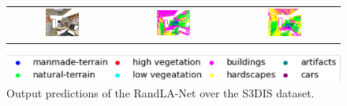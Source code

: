 \begin{figure}[h!]
\begin{tabular}{ccc}
            \includegraphics[width=0.33\textwidth, height=0.18\textheight]{images/seg_output/s3dis_DE/S3DIS_4_RGB.png} &
            \includegraphics[width=0.33\textwidth, height=0.18\textheight]{images/seg_output/s3dis_DE/S3DIS_4_Pred.png}&
            \includegraphics[width=0.33\textwidth, height=0.18\textheight]{images/seg_output/s3dis_DE/office_42.png} \\
        \end{tabular}
        \includegraphics[scale=0.65]{images/legend.png}
        \caption{Output predictions of the RandLA-Net over the S3DIS dataset.}
        \label{fig:de_s3dis_vis}
    \end{figure}
